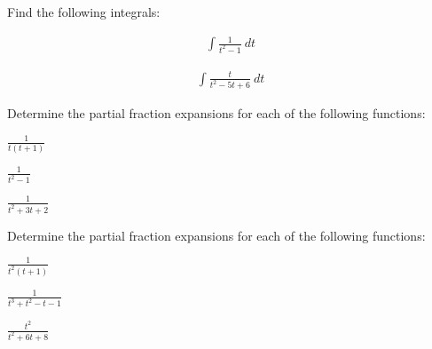 

\begin{problem}
\item Find the following integrals:

  \begin{subproblem}
  \item 
    \begin{eqnarray*}
      \int \frac{1}{t^2-1} ~ dt 
    \end{eqnarray*}
    \vfill

  \item 
    \begin{eqnarray*}
      \int \frac{t}{t^2-5t+6} ~ dt
    \end{eqnarray*}
    \vfill

  \end{subproblem}
\end{problem}


  \begin{problem}
  \item Determine the partial fraction expansions for each of the following functions:

    \begin{subproblem}
      \item $\frac{1}{t(t+1)}$
        \vfill
      \item $\frac{1}{t^2-1}$
        \vfill
      \item $\frac{1}{t^2+3t+2}$
        \vfill
    \end{subproblem}


    \clearpage
  \item Determine the partial fraction expansions for each of the following functions:

    \begin{subproblem}
      \item $\frac{1}{t^2(t+1)}$
        \vfill
      \item $\frac{1}{t^3+t^2-t-1}$
        \vfill
      \item $\frac{t^2}{t^2+6t+8}$
        \vfill
    \end{subproblem}


  \end{problem}


